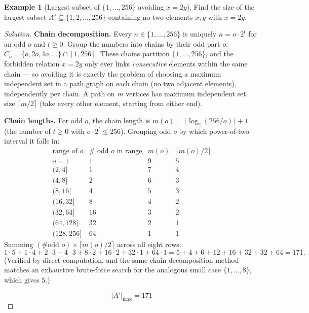 \documentclass[11pt]{article}
\theoremstyle{definition}
\newtheorem{example}{Example}[section]
\begin{document}
\begin{example}[Largest subset of $\{1,\dots,256\}$ avoiding $x=2y$]
Find the size of the largest subset $A'\subseteq\{1,2,\dots,256\}$ containing no two elements $x,y$ with $x=2y$.
\end{example}
\begin{proof}[Solution]
\textbf{Chain decomposition.} Every $n\in\{1,\dots,256\}$ is uniquely $n=o\cdot2^t$ for an odd $o$ and $t\ge0$. Group the numbers into chains by their odd part $o$: $C_o=\{o,2o,4o,\dots\}\cap[1,256]$. These chains partition $\{1,\dots,256\}$, and the forbidden relation $x=2y$ only ever links \emph{consecutive} elements within the same chain — so avoiding it is exactly the problem of choosing a maximum independent set in a path graph on each chain (no two adjacent elements), independently per chain. A path on $m$ vertices has maximum independent set size $\lceil m/2\rceil$ (take every other element, starting from either end).

\textbf{Chain lengths.} For odd $o$, the chain length is $m(o)=\bigl\lfloor\log_2(256/o)\bigr\rfloor+1$ (the number of $t\ge0$ with $o\cdot2^t\le256$). Grouping odd $o$ by which power-of-two interval it falls in:
\[
\begin{array}{c|c|c|c}
\text{range of }o & \#\text{ odd }o\text{ in range} & m(o) & \lceil m(o)/2\rceil\\\hline
o=1 & 1 & 9 & 5\\
(2,4] & 1 & 7 & 4\\
(4,8] & 2 & 6 & 3\\
(8,16] & 4 & 5 & 3\\
(16,32] & 8 & 4 & 2\\
(32,64] & 16 & 3 & 2\\
(64,128] & 32 & 2 & 1\\
(128,256] & 64 & 1 & 1
\end{array}
\]
Summing $(\#\text{odd }o)\times\lceil m(o)/2\rceil$ across all eight rows:
\[
1\cdot5+1\cdot4+2\cdot3+4\cdot3+8\cdot2+16\cdot2+32\cdot1+64\cdot1=5+4+6+12+16+32+32+64=171.
\]
(Verified by direct computation, and the same chain-decomposition method matches an exhaustive brute-force search for the analogous small case $\{1,\dots,8\}$, which gives $5$.)

\[
\boxed{|A'|_{\max}=171}
\]
\end{proof}
\end{document}
